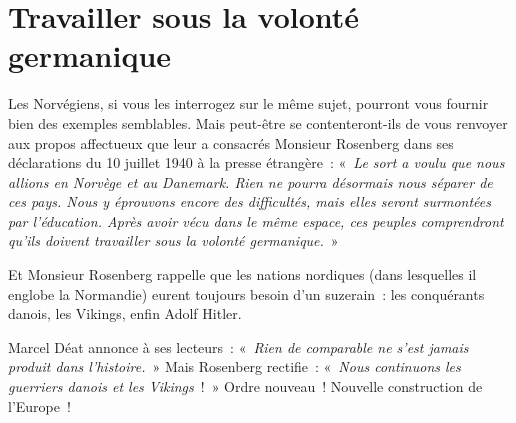\documentclass[french,twoside]{book} %
\begin{document}
\section[Travailler sous la volonté germanique]{Travailler sous la volonté germanique}
\noindent Les Norvégiens, si vous les interrogez sur le même sujet, pourront vous fournir bien des exemples semblables. Mais peut-être se contenteront-ils de vous renvoyer aux propos affectueux que leur a consacrés Monsieur Rosenberg dans ses déclarations du 10 juillet 1940 à la presse étrangère : « \emph{Le sort a voulu que nous allions en Norvège et au Danemark. Rien ne pourra désormais nous séparer de ces pays. Nous y éprouvons encore des difficultés, mais elles seront surmontées par l’éducation. Après avoir vécu dans le même espace, ces peuples comprendront qu’ils doivent travailler sous la volonté germanique.} »\par
Et Monsieur Rosenberg rappelle que les nations nordiques (dans lesquelles il englobe la Normandie) eurent toujours besoin d’un suzerain : les conquérants danois, les Vikings, enfin Adolf Hitler.\par
Marcel Déat annonce à ses lecteurs : « \emph{Rien de comparable ne s’est jamais produit dans l’histoire.} » Mais Rosenberg rectifie : « \emph{Nous continuons les guerriers danois et les Vikings} ! » Ordre nouveau ! Nouvelle construction de l’Europe !
\end{document}
